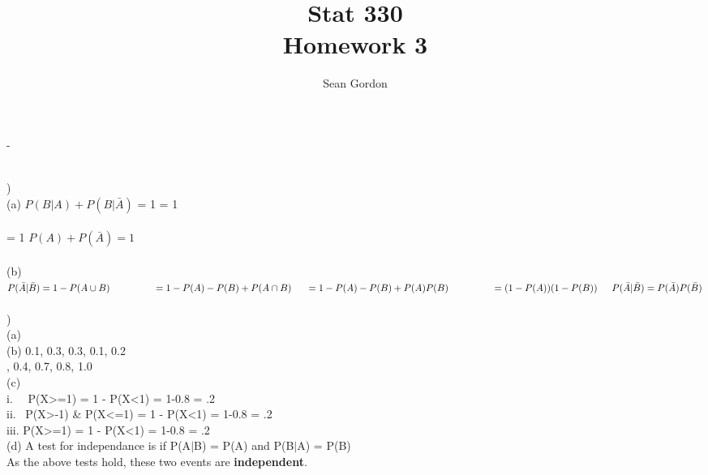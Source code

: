 -\documentclass[12pt]{article}
\title{Stat 330\\Homework 3}
\author{Sean Gordon}
\begin{document}
\maketitle


\noindent\hrulefill \\


)\\
\indent (a) $P(B|A) + P(B|\bar{A})$ = 1
\indent \indent {} = 1\\\\
\indent {} = 1
\indent \indent \indent  $P(A) + P(\bar{A}) = 1$ \checkmark\\

\indent \indent  \hrulefill \indent \indent \indent \\

\indent (b) $P(\bar{A}|\bar{B}) = 1 - P(A \cup B)
\indent \indent \indent = 1 - P(A) - P(B) + P(A \cap B)\\\\
\indent = 1 - P(A) - P(B) + P(A)P(B)
\indent \indent \indent = (1 - P(A))(1 - P(B))\\\\
\indent  P(\bar{A}|\bar{B}) = P(\bar{A})P(\bar{B})$ \checkmark\\


\noindent \hrulefill \\


)\\
\indent (a) \\
\indent (b) 0.1, 0.3, 0.3, 0.1, 0.2\\
\indent {}, 0.4, 0.7, 0.8, 1.0\\
\indent (c) \\
\indent \indent i. \ \ P(X>=1) = 1 - P(X<1) = 1-0.8 = .2\\
\indent \indent ii. \ P(X>-1) & P(X<=1) = 1 - P(X<1) = 1-0.8 = .2\\
\indent \indent iii. P(X>=1) = 1 - P(X<1) = 1-0.8 = .2\\
\indent (d) A test for independance is if P(A$|$B) = P(A) and P(B$|$A) = P(B)\\
\indent \indent As the above tests hold, these two events are \textbf{independent}.\\


\noindent \hrulefill \\
\pagebreak
\end{document}
